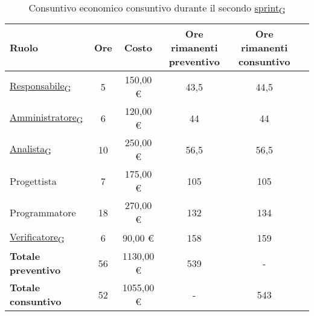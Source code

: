 \begin{table}[!h]
	\centering
	\begin{tabular}{ | l | c | c | c | c | c | }
		\hline
		\textbf{Ruolo}             & \textbf{Ore} & \textbf{Costo} & \textbf{Ore rimanenti preventivo} & \textbf{Ore rimanenti consuntivo} \\
		\hline
		\href{https://7last.github.io/docs/rtb/documentazione-interna/glossario\#responsabile}{Responsabile\textsubscript{G}}               & 5            & 150,00 €       & 43,5                              & 44,5                              \\
		\href{https://7last.github.io/docs/rtb/documentazione-interna/glossario\#amministratore}{Amministratore\textsubscript{G}}             & 6            & 120,00 €       & 44                                & 44                                \\
		\href{https://7last.github.io/docs/rtb/documentazione-interna/glossario\#analista}{Analista\textsubscript{G}}                   & 10           & 250,00 €       & 56,5                              & 56,5                              \\
		Progettista                & 7            & 175,00 €       & 105                               & 105                               \\
		Programmatore              & 18           & 270,00 €       & 132                               & 134                               \\
		\href{https://7last.github.io/docs/rtb/documentazione-interna/glossario\#verificatore}{Verificatore\textsubscript{G}}               & 6            & 90,00 €        & 158                               & 159                               \\
		\hline
		\textbf{Totale preventivo} & 56           & 1130,00 €      & 539                               & -                                 \\
		\hline
		\textbf{Totale consuntivo} & 52           & 1055,00 €      & -                                 & 543                               \\
		\hline
	\end{tabular}
	\caption{Consuntivo economico consuntivo durante il secondo \href{https://7last.github.io/docs/rtb/documentazione-interna/glossario\#sprint}{sprint\textsubscript{G}}}
	
\end{table}

